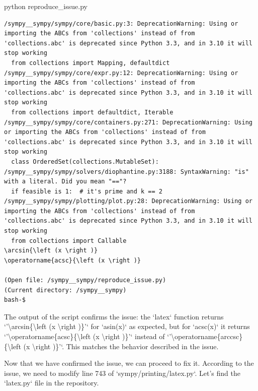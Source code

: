 {\begin{agentbox}
\hrulefill
\begin{CodeVerbatim}[breaklines=true, breakanywhere=true]
python reproduce_issue.py
\end{CodeVerbatim}
\end{agentbox}
\begin{observationbox}\begin{Verbatim}[breaklines=true, breakanywhere=true]
/sympy__sympy/sympy/core/basic.py:3: DeprecationWarning: Using or importing the ABCs from 'collections' instead of from 'collections.abc' is deprecated since Python 3.3, and in 3.10 it will stop working
  from collections import Mapping, defaultdict
/sympy__sympy/sympy/core/expr.py:12: DeprecationWarning: Using or importing the ABCs from 'collections' instead of from 'collections.abc' is deprecated since Python 3.3, and in 3.10 it will stop working
  from collections import defaultdict, Iterable
/sympy__sympy/sympy/core/containers.py:271: DeprecationWarning: Using or importing the ABCs from 'collections' instead of from 'collections.abc' is deprecated since Python 3.3, and in 3.10 it will stop working
  class OrderedSet(collections.MutableSet):
/sympy__sympy/sympy/solvers/diophantine.py:3188: SyntaxWarning: "is" with a literal. Did you mean "=="?
  if feasible is 1:  # it's prime and k == 2
/sympy__sympy/sympy/plotting/plot.py:28: DeprecationWarning: Using or importing the ABCs from 'collections' instead of from 'collections.abc' is deprecated since Python 3.3, and in 3.10 it will stop working
  from collections import Callable
\arcsin{\left (x \right )}
\operatorname{acsc}{\left (x \right )}

(Open file: /sympy__sympy/reproduce_issue.py)
(Current directory: /sympy__sympy)
bash-$
\end{Verbatim}
\end{observationbox}
\begin{agentbox}
The output of the script confirms the issue: the `latex` function returns `'{\textbackslash}arcsin\{{\textbackslash}left (x {\textbackslash}right )\}'` for `asin(x)` as expected, but for `acsc(x)` it returns `'{\textbackslash}operatorname\{acsc\}\{{\textbackslash}left (x {\textbackslash}right )\}'` instead of `'{\textbackslash}operatorname\{arccsc\}\{{\textbackslash}left (x {\textbackslash}right )\}'`. This matches the behavior described in the issue.



Now that we have confirmed the issue, we can proceed to fix it. According to the issue, we need to modify line 743 of `sympy/printing/latex.py`. Let's find the `latex.py` file in the repository.




\end{agentbox}}
